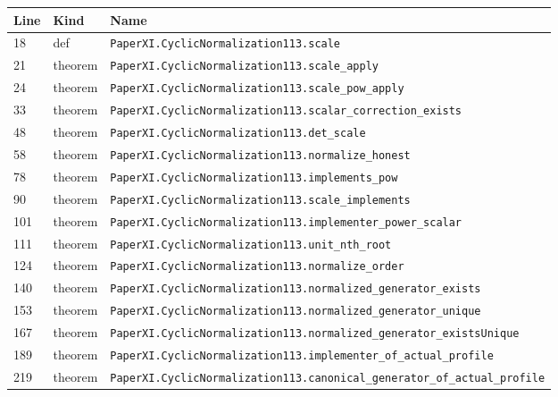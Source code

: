 \documentclass[10pt,oneside]{book}
\begin{document}
\begin{longtable}{@{}p{}p{}p{}@{}}\toprule Line&Kind&Name\\\midrule\endhead

18&def&\nolinkurl{PaperXI.CyclicNormalization113.scale}\\

21&theorem&\nolinkurl{PaperXI.CyclicNormalization113.scale_apply}\\

24&theorem&\nolinkurl{PaperXI.CyclicNormalization113.scale_pow_apply}\\

33&theorem&\nolinkurl{PaperXI.CyclicNormalization113.scalar_correction_exists}\\

48&theorem&\nolinkurl{PaperXI.CyclicNormalization113.det_scale}\\

58&theorem&\nolinkurl{PaperXI.CyclicNormalization113.normalize_honest}\\

78&theorem&\nolinkurl{PaperXI.CyclicNormalization113.implements_pow}\\

90&theorem&\nolinkurl{PaperXI.CyclicNormalization113.scale_implements}\\

101&theorem&\nolinkurl{PaperXI.CyclicNormalization113.implementer_power_scalar}\\

111&theorem&\nolinkurl{PaperXI.CyclicNormalization113.unit_nth_root}\\

124&theorem&\nolinkurl{PaperXI.CyclicNormalization113.normalize_order}\\

140&theorem&\nolinkurl{PaperXI.CyclicNormalization113.normalized_generator_exists}\\

153&theorem&\nolinkurl{PaperXI.CyclicNormalization113.normalized_generator_unique}\\

167&theorem&\nolinkurl{PaperXI.CyclicNormalization113.normalized_generator_existsUnique}\\

189&theorem&\nolinkurl{PaperXI.CyclicNormalization113.implementer_of_actual_profile}\\

219&theorem&\nolinkurl{PaperXI.CyclicNormalization113.canonical_generator_of_actual_profile}\\


\end{longtable}
\end{document}
